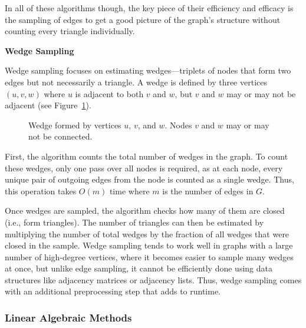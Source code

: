 \documentclass[11pt]{article}
\newcommand{\subsubsubsection}[1]{
  \vspace{1em} %
  \noindent\textbf{#1} %
  \vspace{0.5em} %
}
\begin{document}
In all of these algorithms though, the key piece of their efficiency and efficacy is the sampling of edges to get a good picture of the graph's structure without counting every triangle individually.

\subsubsubsection{Wedge Sampling}

Wedge sampling \cite{seshadhri_triadic_2013} focuses on estimating wedges—triplets of nodes that form two edges but not necessarily a triangle.
A wedge is defined by three vertices $(u, v, w)$ where $u$ is adjacent to both $v$ and $w$, but $v$ and $w$ may or may not be adjacent (see Figure~\ref{fig:wedge_diagram}).

\begin{figure}[H]
    \centering
    \caption{Wedge formed by vertices $u$, $v$, and $w$. Nodes $v$ and $w$ may or may not be connected.}
    \label{fig:wedge_diagram}
\end{figure}

First, the algorithm counts the total number of wedges in the graph.
To count these wedges, only one pass over all nodes is required, as at each node, every unique pair of outgoing edges from the node is counted as a single wedge.
Thus, this operation takes $O(m)$ time where $m$ is the number of edges in $G$.

Once wedges are sampled, the algorithm checks how many of them are closed (i.e., form triangles).
The number of triangles can then be estimated by multiplying the number of total wedges by the fraction of all wedges that were closed in the sample.
Wedge sampling tends to work well in graphs with a large number of high-degree vertices, where it becomes easier to sample many wedges at once, but unlike edge sampling, it cannot be efficiently done using data structures like adjacency matrices or adjacency lists.
Thus, wedge sampling comes with an additional preprocessing step that adds to runtime.

\subsubsection{Linear Algebraic Methods}
\end{document}
